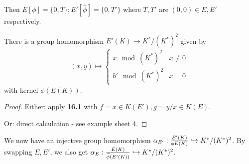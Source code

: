 \documentclass[10pt,a4paper]{article}
\begin{document}
Then $E[\phi] = \{0,T\}; E'[\hat{\phi}] = \{0, T'\}$ where $T, T'$ are $(0,0)\in E,E'$ respectively.

\begin{proposition}
  There is a group homomorphism $E'(K) \to K^\ast/(K^\ast)^2$ given by
  \[(x,y) \mapsto \begin{cases} x \mod (K^\ast)^2 & x \neq 0\\ b' \mod (K^\ast)^2 & x = 0\end{cases}\]
  with kernel $\phi(E(K))$.
\end{proposition}
\begin{proof}
  Either: apply \textbf{16.1} with $f = x \in K(E'), g = y/x \in K(E)$.

  Or: direct calculation - see example sheet 4.
\end{proof}
We now have an injective group homomorphism $\alpha_{E'} : \frac{E'(K)}{\phi E(K)} \hookrightarrow K^\ast/(K^\ast)^2$. By swapping $E,E'$, we also get $\alpha_E : \frac{E(K)}{\widehat{\phi}(E'(K))}\hookrightarrow K^\ast/(K^\ast)^2$.
\end{document}
